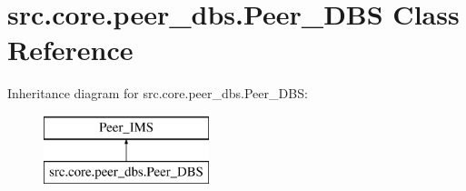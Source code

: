 \hypertarget{classsrc_1_1core_1_1peer__dbs_1_1Peer__DBS}{}\section{src.\+core.\+peer\+\_\+dbs.\+Peer\+\_\+\+D\+B\+S Class Reference}
\label{classsrc_1_1core_1_1peer__dbs_1_1Peer__DBS}
Inheritance diagram for src.\+core.\+peer\+\_\+dbs.\+Peer\+\_\+\+D\+B\+S\+:\begin{figure}[H]
\begin{center}
\leavevmode
\includegraphics[height=2.000000cm]{classsrc_1_1core_1_1peer__dbs_1_1Peer__DBS}
\end{center}
\end{figure}
